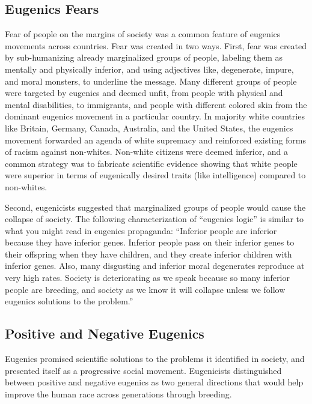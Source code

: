 \documentclass[
  oneside,
  12pt]{crumpbook}
\begin{document}
\hypertarget{eugenics-fears}{%
\subsection{Eugenics Fears}\label{eugenics-fears}}

Fear of people on the margins of society was a common feature of eugenics movements across countries. Fear was created in two ways. First, fear was created by sub-humanizing already marginalized groups of people, labeling them as mentally and physically inferior, and using adjectives like, degenerate, impure, and moral monsters, to underline the message. Many different groups of people were targeted by eugenics and deemed unfit, from people with physical and mental disabilities, to immigrants, and people with different colored skin from the dominant eugenics movement in a particular country. In majority white countries like Britain, Germany, Canada, Australia, and the United States, the eugenics movement forwarded an agenda of white supremacy and reinforced existing forms of racism against non-whites. Non-white citizens were deemed inferior, and a common strategy was to fabricate scientific evidence showing that white people were superior in terms of eugenically desired traits (like intelligence) compared to non-whites.

Second, eugenicists suggested that marginalized groups of people would cause the collapse of society. The following characterization of ``eugenics logic'' is similar to what you might read in eugenics propaganda: ``Inferior people are inferior because they have inferior genes. Inferior people pass on their inferior genes to their offspring when they have children, and they create inferior children with inferior genes. Also, many disgusting and inferior moral degenerates reproduce at very high rates. Society is deteriorating as we speak because so many inferior people are breeding, and society as we know it will collapse unless we follow eugenics solutions to the problem.''

\hypertarget{positive-and-negative-eugenics}{%
\subsection{Positive and Negative Eugenics}\label{positive-and-negative-eugenics}}

Eugenics promised scientific solutions to the problems it identified in society, and presented itself as a progressive social movement. Eugenicists distinguished between positive and negative eugenics as two general directions that would help improve the human race across generations through breeding.
\end{document}
